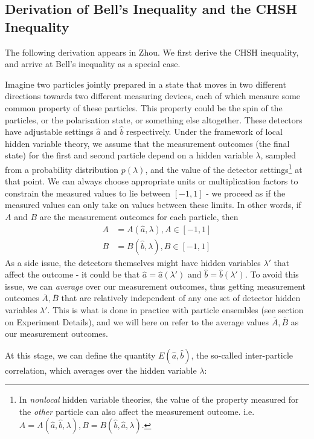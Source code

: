 \documentclass[aps,prl,nofootinbib,twocolumn,superscriptaddress,groupedaddress]{revtex4}  %
\begin{document}
\subsection{Derivation of Bell's Inequality and the CHSH Inequality}

The following derivation appears in Zhou\cite{bellderivation}. We first derive the CHSH inequality, and arrive at Bell's inequality as a special case.

Imagine two particles jointly prepared in a state that moves in two different directions towards two different measuring devices, each of which measure some common property of these particles. This property could be the spin of the particles, or the polarisation state, or something else altogether. These detectors have adjustable settings $\hat{a}$ and $\hat{b}$ respectively. Under the framework of local hidden variable theory, we assume that the measurement outcomes (the final state) for the first and second particle depend on a hidden variable $\lambda$, sampled from a probability distribution $p(\lambda)$, and the value of the detector settings\footnote{In \textit{nonlocal} hidden variable theories, the value of the property measured for the \textit{other} particle can also affect the measurement outcome. i.e. $A = A(\hat{a},\hat{b},\lambda), B = B(\hat{b},\hat{a},\lambda)$.} at that point. We can always choose appropriate units or multiplication factors to constrain the measured values to lie between $[-1,1]$ - we proceed as if the measured values can only take on values between these limits. In other words, if $A$ and $B$ are the measurement outcomes for each particle, then
\begin{align}
A &= A(\hat{a}, \lambda), A \in [-1,1]\\
B &= B(\hat{b}, \lambda), B \in [-1,1]
\end{align}
As a side issue, the detectors themselves might have hidden variables $\lambda'$ that affect the outcome - it could be that $\hat{a} = \hat{a}(\lambda')$ and $\hat{b} = \hat{b}(\lambda')$. To avoid this issue, we can \textit{average} over our measurement outcomes, thus getting measurement outcomes $\overline{A},\overline{B}$ that are relatively independent of any one set of detector hidden variables $\lambda'$. This is what is done in practice with particle ensembles (see section on Experiment Details), and we will here on refer to the average values $\overline{A}, \overline{B}$ as our measurement outcomes.

At this stage, we can define the quantity $E(\hat{a}, \hat{b})$, the so-called inter-particle correlation, which averages over the hidden variable $\lambda$:
\end{document}
